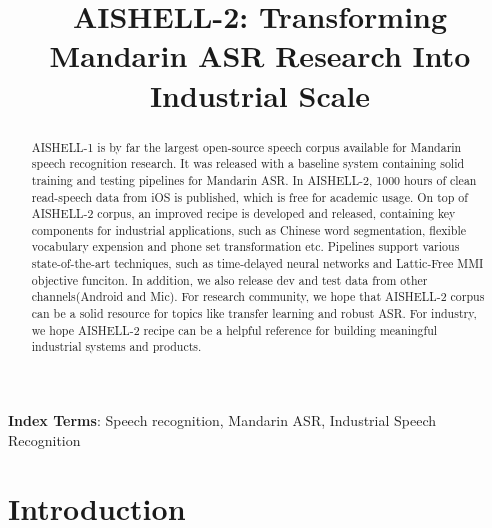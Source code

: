 \documentclass[a4paper]{article}
\title{AISHELL-2: Transforming Mandarin ASR Research Into Industrial Scale}
\begin{document}
\maketitle
%
\begin{abstract}
AISHELL-1 is by far the largest open-source speech corpus available for Mandarin
speech recognition research. It was released with a baseline system containing solid
training and testing pipelines for Mandarin ASR. In AISHELL-2, 1000 hours of
clean read-speech data from iOS is published, which is free for academic usage. On top of
AISHELL-2 corpus, an improved recipe is developed and released, containing key
components for industrial applications, such as Chinese word segmentation,
flexible vocabulary expension and phone set transformation etc. 
Pipelines support various state-of-the-art techniques, such
as time-delayed neural networks and Lattic-Free MMI objective funciton. 
In addition, we also release dev and test data from other channels(Android and Mic). 
For research community, we hope that AISHELL-2
corpus can be a solid resource for topics like transfer learning and robust
ASR. For industry, we hope AISHELL-2 recipe can be a helpful reference for
building meaningful industrial systems and products.
\end{abstract}
\noindent\textbf{Index Terms}: Speech recognition, Mandarin ASR, Industrial Speech Recognition

\section{Introduction}
\end{document}
